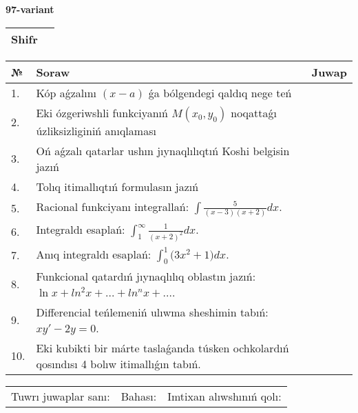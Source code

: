 \documentclass{article}
\begin{document}
  \egroup
  
  \newpage
  
  
  \textbf{97-variant}\\
  
  \bgroup
  \def\arraystretch{1.6} %
  
  \begin{tabular}{|m{5.7cm}|m{9.5cm}|}
  \hline
  Shifr & \\
  \hline
  \end{tabular}
  
  \vspace{1cm}
  
  \begin{tabular}{|m{0.7cm}|m{10cm}|m{4cm}|}
  \hline
  № & Soraw & Juwap \\
  \hline
  1. & Kóp aǵzalını \((x - a)\) ǵa bólgendegi qaldıq nege teń &  \\
  \hline
  2. & Eki ózgeriwshli funkciyanıń \(M(x_{0}, y_{0})\) noqattaǵı úzliksizliginiń anıqlaması &  \\
  \hline
  3. & Oń aǵzalı qatarlar ushın jıynaqlılıqtıń Koshi belgisin jazıń &  \\
  \hline
  4. & Tolıq itimallıqtıń formulasın jazıń &  \\
  \hline
  5. & Racional funkciyanı integrallań: \(\int{\frac{5}{(x - 3)(x + 2)}dx}\). &  \\
  \hline
  6. & Integraldı esaplań: \(\int_{1}^{\infty}{\frac{1}{(x + 2)^2 }dx}\). &  \\
  \hline
  7. & Anıq integraldı esaplań: \(\int_{0}^{1}{(3x^2 } + 1)dx\). &  \\
  \hline
  8. & Funkcional qatardıń jıynaqlılıq oblastın jazıń: \(\ln x + ln^2 x + ... + ln^{n}x + ...\). &  \\
  \hline
  9. & Differencial teńlemeniń ulıwma sheshimin tabıń: \(xy' - 2y = 0\). &  \\
  \hline
  10. & Eki kubikti bir márte taslaǵanda túsken ochkolardıń qosındısı 4 bolıw itimallıǵın tabıń. &  \\
  \hline
  \end{tabular}
  
  \vspace{1cm}
  
  \begin{tabular}{lll}
  Tuwrı juwaplar sanı: \underline{\hspace{1.5cm}} & 
  Bahası: \underline{\hspace{1.5cm}} & 
  Imtixan alıwshınıń qolı: \underline{\hspace{2cm}} \\
  \end{tabular}
  
\end{document}
